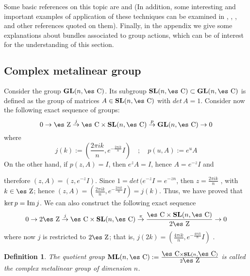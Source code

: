 \documentclass[12pt]{article}
\newtheorem{definition}{Definition}
\def\beq{\begin{equation}}
\def\eeq{\end{equation}}
\def\dst{\(}
\def\map#1{\mathrel{\mathop{\to}\limits^{#1}}}
\def\GL{{\bf GL}(n,\Complex )}
\def\SL{{\bf SL}(n,\Complex )}
\def\ML{{\bf ML}(n,\Complex )}
\def\Zahl{\mbox{\es Z}}
\def\Complex{\mbox{\es C}}
\begin{document}
Some basic references on this topic are \cite{Ga-83} and \cite{Wo-80}
(In addition, some interesting and important examples of application of
these techniques
can be examined in \cite{Sn-80}, \cite{Tu-85}, \cite{Wo-80},
and other references quoted on them).
Finally, in the appendix we give some explanations about bundles
associated to
group actions, which can be of interest for the understanding of this
section.



\subsection{Complex metalinear group}


Consider the group $\GL$. Its subgroup $\SL \subset \GL$
is defined as the group of matrices $A \in \SL$  with $det\, A = 1$.
Consider now the following exact sequence of groups:
\beq
0 \map{} \Zahl \map{j} \Complex \times \SL \map{p} \GL \map{} 0
\label{es1}
\eeq
where
$$
j(k) := \left(\frac{2\pi i k}{n},e^{-\frac{2\pi i k}{n}}I\right)
\quad ; \quad
p(u,A) := e^{u}A
$$
On the other hand, if $p(z,A)=I$, then $e^{z}A=I$, hence $A=e^{-z}I$ and

therefore
$(z,A)=(z,e^{-z}I)$. Since $1=det\, (e^{-z}I=e^{-zn}$, then \dst
z=\frac{2\pi i k}{n}\) ,
with $k \in \Zahl$; hence $(z,A)=(\frac{2\pi i k}{n},e^{-\frac{2\pi i
k}{n}}I)= j(k)$.
Thus, we have proved that $\ker p = {\rm Im}\, j$.
We can also construct the following exact sequence
\beq
0 \map{} 2\Zahl \map{j} \Complex \times \SL \map{\pi}
\frac{\Complex \times \SL}{2\Zahl} \map{} 0
\label{es2}
\eeq
where now $j$ is restricted to $2\Zahl$; that is,
\dst j(2k) =\left(\frac{4\pi i k}{n},e^{-\frac{4\pi i k}{n}}I\right) \)
.

\begin{definition}
The quotient group \dst \ML :=\frac{\Complex \times \SL}{2\Zahl}\)
is called the {\rm complex metalinear group} of dimension $n$.
\end{definition}
\end{document}
